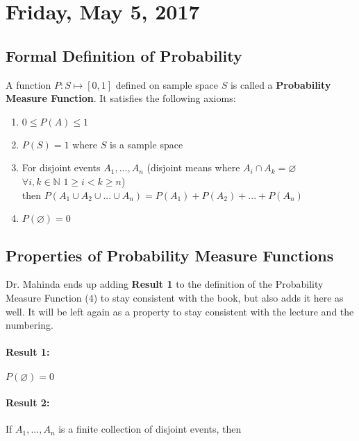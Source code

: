 \documentclass[12pt, twoside]{article}
\begin{document}
\newpage

\section{Friday, May 5, 2017}

\subsection{Formal Definition of Probability}

\begin{tcolorbox}[title= Probability Measure Function (PMF)]

A function $P:S\longmapsto [0,1]$ defined on sample space $S$ is called a \textbf{Probability Measure Function}. It satisfies the following axioms:
\begin{enumerate}
	\item{$0 \leq P(A) \leq 1$}
	\item{$P(S) = 1$ where $S$ is a sample space}
	\item{
	For disjoint events $A_1, ... , A_n$ (disjoint means where $A_i \cap A_k = \varnothing$\\
	$\forall i,k \in\mathbb{N}$ $1 \geq i < k \geq n$)\\
	then $P(A_1 \cup A_2 \cup ... \cup A_n) = P(A_1) + P(A_2) + ... + P(A_n)$
	}
	\item{$P(\varnothing) = 0$}
\end{enumerate}
\end{tcolorbox}

\subsection{Properties of Probability Measure Functions}

Dr. Mahinda ends up adding \textbf{Result 1} to the definition of the Probability Measure Function (4) to stay consistent with the book, but also adds it here as well. It will be left again as a property to stay consistent with the lecture and the numbering.

\paragraph{Result 1:} $P(\varnothing) = 0$
\paragraph{Result 2:} If $A_1, ... , A_n$ is a finite collection of disjoint events, then
\end{document}
